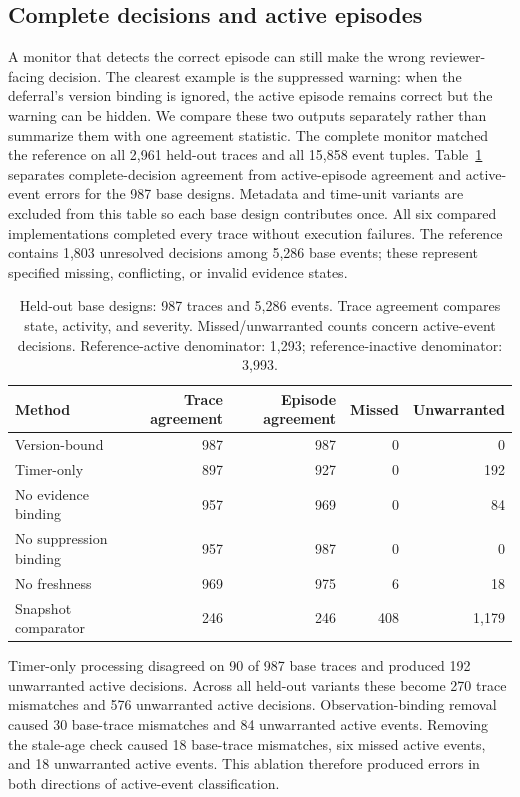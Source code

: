 \documentclass[preprint,11pt]{elsarticle}
\begin{document}
\subsection{Complete decisions and active episodes}
\label{sec:agreements}
A monitor that detects the correct episode can still make the wrong reviewer-facing decision. The clearest example is the suppressed warning: when the deferral's version binding is ignored, the active episode remains correct but the warning can be hidden. We compare these two outputs separately rather than summarize them with one agreement statistic. The complete monitor matched the reference on all 2,961 held-out traces and all 15,858 event tuples. Table~\ref{tab:results} separates complete-decision agreement from active-episode agreement and active-event errors for the 987 base designs. Metadata and time-unit variants are excluded from this table so each base design contributes once. All six compared implementations completed every trace without execution failures. The reference contains 1,803 unresolved decisions among 5,286 base events; these represent specified missing, conflicting, or invalid evidence states.

\begin{table}[H]
\centering\small
\caption{Held-out base designs: 987 traces and 5,286 events. Trace agreement compares state, activity, and severity. Missed/unwarranted counts concern active-event decisions. Reference-active denominator: 1,293; reference-inactive denominator: 3,993.}\label{tab:results}
\begin{tabular}{@{}lrrrr@{}}\toprule
Method & Trace agreement & Episode agreement & Missed & Unwarranted\\\midrule
Version-bound &987&987&0&0\\
Timer-only &897&927&0&192\\
No evidence binding &957&969&0&84\\
No suppression binding &957&987&0&0\\
No freshness &969&975&6&18\\
Snapshot comparator &246&246&408&1,179\\\bottomrule
\end{tabular}
\end{table}

Timer-only processing disagreed on 90 of 987 base traces and produced 192 unwarranted active decisions. Across all held-out variants these become 270 trace mismatches and 576 unwarranted active decisions. Observation-binding removal caused 30 base-trace mismatches and 84 unwarranted active events. Removing the stale-age check caused 18 base-trace mismatches, six missed active events, and 18 unwarranted active events. This ablation therefore produced errors in both directions of active-event classification.
\end{document}
